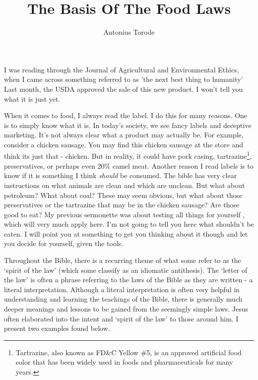 \documentclass[10pt]{article}
\title{The Basis Of The Food Laws}
\author{Antonius Torode}
\begin{document}
\maketitle
\thispagestyle{fancy}

\begin{multicols}{2}

I was reading through the Journal of Agricultural and Environmental Ethics, when I came across something referred to as 'the next best thing to humanity' \cite{Alvaro} Last month, the USDA approved the sale of this new product. I won't tell you what it is just yet.




When it comes to food, I always read the label. I do this for many reasons. One is to simply know what it is. In today's society, we see fancy labels and deceptive marketing. It's not always clear what a product may actually be. For example, consider a chicken sausage. You may find this chicken sausage at the store and think its just that - chicken. But in reality, it could have pork casing, tartrazine\footnote{Tartrazine, also known as FD\&C Yellow \#5, is an approved artificial food color that has been widely used in foods and pharmaceuticals for many years.}, preservatives, or perhaps even 20\% camel meat. Another reason I read labels is to know if it is something I think \textit{should} be consumed. The bible has very clear instructions on what animals are clean and which are unclean. But what about petroleum? What about coal? These may seem obvious, but what about those preservatives or the tartrazine that may be in the chicken sausage? Are those good to eat? My previous sermonette was about testing all things for yourself \cite{test all things}, which will very much apply here. I'm not going to tell you here what shouldn't be eaten. I will point you at something to get you thinking about it though and let you decide for yourself, given the tools.

Throughout the Bible, there is a recurring theme of what some refer to as the `spirit of the law' (which some classify as an idiomatic antithesis). The `letter of the law' is often a phrase referring to the laws of the Bible as they are written - a literal interpretation. Although a literal interpretation is often very helpful in understanding and learning the teachings of the Bible, there is generally much deeper meanings and lessons to be gained from the seemingly simple laws. Jesus often elaborated into the intent and `spirit of the law' to those around him. I present two examples found below.


\end{multicols}
\end{document}
